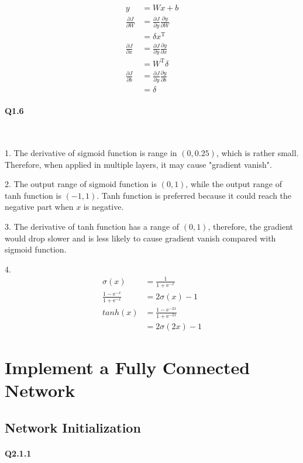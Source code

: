 \documentclass[11pt]{article} \usepackage{fullpage} \usepackage{graphicx} \usepackage{epstopdf} \usepackage{color} \usepackage{psfrag} \usepackage{pdfsync}\usepackage{indentfirst}\usepackage{subfigure}\usepackage{float}\usepackage[section]{placeins}
\begin{document}
\begin{align}
	y & = Wx + b \\
	\frac{\partial J}{\partial W} & = \frac{\partial J}{\partial y}\frac{\partial y}{\partial W} \\
	& = \delta x^\mathrm{T} \\
	\frac{\partial J}{\partial x} & = \frac{\partial J}{\partial y}\frac{\partial y}{\partial x} \\
	& = W^\mathrm{T}\delta \\
	\frac{\partial J}{\partial b} & = \frac{\partial J}{\partial y}\frac{\partial y}{\partial b} \\
	& = \delta
\end{align}

\paragraph{Q1.6}~{}

1. The derivative of sigmoid function is range in $\left(0, 0.25\right)$, which is rather small. Therefore, when applied in multiple layers, it may cause "gradient vanish".

2. The output range of sigmoid function is $\left(0, 1\right)$, while the output range of tanh function is $\left(-1, 1\right)$. Tanh function is preferred because it could reach the negative part when $x$ is negative.

3. The derivative of tanh function has a range of $\left(0, 1\right)$, therefore, the gradient would drop slower and is less likely to cause gradient vanish compared with sigmoid function.

4. 
\begin{align}
	\sigma(x) & = \frac{1}{1+\mathrm{e}^{-x}} \\
	\frac{1-\mathrm{e}^{-x}}{1+\mathrm{e}^{-x}} & = 2\sigma(x) - 1 \\
	tanh(x) & = \frac{1-\mathrm{e}^{-2x}}{1+\mathrm{e}^{-2x}} \\
	& = 2\sigma(2x) - 1
\end{align}

\section{Implement a Fully Connected Network}
\subsection{Network Initialization}

\paragraph{Q2.1.1}~{}
\end{document}
